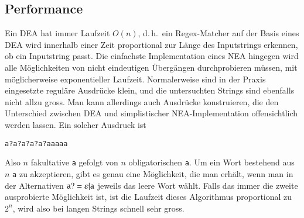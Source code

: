 \subsection{Performance}
Ein DEA hat immer Laufzeit $O(n)$, d.\,h.~ein Regex-Matcher auf der
Basis eines DEA wird innerhalb einer Zeit proportional zur
Länge des Inputstrings erkennen, ob ein Inputstring passt.
Die einfachste Implementation eines NEA hingegen wird alle Möglichkeiten
von nicht eindeutigen Übergängen durchprobieren müssen, mit
möglicherweise exponentieller Laufzeit.
Normalerweise sind in der
Praxis eingesetzte reguläre Ausdrücke klein, und die untersuchten
Strings sind ebenfalls nicht allzu gross.
Man kann allerdings auch
Ausdrücke konstruieren, die den Unterschied zwischen DEA und simplistischer
NEA-Implementation offensichtlich werden lassen.
Ein solcher Ausdruck ist
\begin{center}
\tt a?a?a?a?a?aaaaa
\end{center}
Also $n$ fakultative {\tt a} gefolgt von $n$ obligatorischen {\tt a}.
Um ein Wort bestehend aus $n$ {\tt a} zu akzeptieren, gibt es genau eine
Möglichkeit, die man erhält, wenn man in der Alternativen
${\tt a?} = \varepsilon|{\tt a}$
jeweils das leere Wort wählt.
Falls das immer die zweite ausprobierte 
Möglichkeit ist, ist die Laufzeit dieses Algorithmus proportional zu
$2^n$, wird also bei langen Strings schnell sehr gross.

